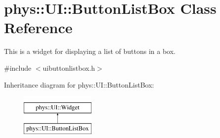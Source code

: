 \hypertarget{classphys_1_1UI_1_1ButtonListBox}{
\section{phys::UI::ButtonListBox Class Reference}
\label{d4/dd7/classphys_1_1UI_1_1ButtonListBox}
}


This is a widget for displaying a list of buttons in a box.  




{\ttfamily \#include $<$uibuttonlistbox.h$>$}

Inheritance diagram for phys::UI::ButtonListBox:\begin{figure}[H]
\begin{center}
\leavevmode
\includegraphics[height=2.000000cm]{d4/dd7/classphys_1_1UI_1_1ButtonListBox}
\end{center}
\end{figure}
